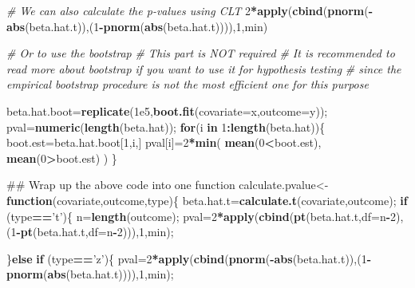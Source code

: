 \documentclass[12pt,]{book}
\newenvironment{Shaded}{\begin{snugshade}}{\end{snugshade}}
\newcommand{\KeywordTok}[1]{\textcolor[rgb]{0.13,0.29,0.53}{\textbf{#1}}}
\newcommand{\DataTypeTok}[1]{\textcolor[rgb]{0.13,0.29,0.53}{#1}}
\newcommand{\DecValTok}[1]{\textcolor[rgb]{0.00,0.00,0.81}{#1}}
\newcommand{\FloatTok}[1]{\textcolor[rgb]{0.00,0.00,0.81}{#1}}
\newcommand{\StringTok}[1]{\textcolor[rgb]{0.31,0.60,0.02}{#1}}
\newcommand{\CommentTok}[1]{\textcolor[rgb]{0.56,0.35,0.01}{\textit{#1}}}
\newcommand{\ControlFlowTok}[1]{\textcolor[rgb]{0.13,0.29,0.53}{\textbf{#1}}}
\newcommand{\OperatorTok}[1]{\textcolor[rgb]{0.81,0.36,0.00}{\textbf{#1}}}
\newcommand{\NormalTok}[1]{#1}
\begin{document}
\begin{Shaded}
\begin{Highlighting}[]
\CommentTok{# We can also calculate the p-values using CLT}
\DecValTok{2}\OperatorTok{*}\KeywordTok{apply}\NormalTok{(}\KeywordTok{cbind}\NormalTok{(}\KeywordTok{pnorm}\NormalTok{(}\OperatorTok{-}\KeywordTok{abs}\NormalTok{(beta.hat.t)),(}\DecValTok{1}\OperatorTok{-}\KeywordTok{pnorm}\NormalTok{(}\KeywordTok{abs}\NormalTok{(beta.hat.t)))),}\DecValTok{1}\NormalTok{,min)}

\CommentTok{# Or to use the bootstrap }
\CommentTok{# This part is NOT required}
\CommentTok{# It is recommended to read more about bootstrap if you want to use it for hypothesis testing}
\CommentTok{# since the empirical bootstrap procedure is not the most efficient one for this purpose }

\NormalTok{beta.hat.boot=}\KeywordTok{replicate}\NormalTok{(}\FloatTok{1e5}\NormalTok{,}\KeywordTok{boot.fit}\NormalTok{(}\DataTypeTok{covariate=}\NormalTok{x,}\DataTypeTok{outcome=}\NormalTok{y));}
\NormalTok{pval=}\KeywordTok{numeric}\NormalTok{(}\KeywordTok{length}\NormalTok{(beta.hat));}
\ControlFlowTok{for}\NormalTok{(i }\ControlFlowTok{in} \DecValTok{1}\OperatorTok{:}\KeywordTok{length}\NormalTok{(beta.hat))\{}
\NormalTok{  boot.est=beta.hat.boot[}\DecValTok{1}\NormalTok{,i,]}
\NormalTok{  pval[i]=}\DecValTok{2}\OperatorTok{*}\KeywordTok{min}\NormalTok{( }\KeywordTok{mean}\NormalTok{(}\DecValTok{0}\OperatorTok{<}\NormalTok{boot.est), }\KeywordTok{mean}\NormalTok{(}\DecValTok{0}\OperatorTok{>}\NormalTok{boot.est) )}
\NormalTok{\}}

\NormalTok{## Wrap up the above code into one function}
\NormalTok{calculate.pvalue<-}\ControlFlowTok{function}\NormalTok{(covariate,outcome,type)\{}
\NormalTok{  beta.hat.t=}\KeywordTok{calculate.t}\NormalTok{(covariate,outcome);}
  \ControlFlowTok{if}\NormalTok{ (type}\OperatorTok{==}\StringTok{'t'}\NormalTok{)\{}
\NormalTok{    n=}\KeywordTok{length}\NormalTok{(outcome);}
\NormalTok{    pval=}\DecValTok{2}\OperatorTok{*}\KeywordTok{apply}\NormalTok{(}\KeywordTok{cbind}\NormalTok{(}\KeywordTok{pt}\NormalTok{(beta.hat.t,}\DataTypeTok{df=}\NormalTok{n}\OperatorTok{-}\DecValTok{2}\NormalTok{),(}\DecValTok{1}\OperatorTok{-}\KeywordTok{pt}\NormalTok{(beta.hat.t,}\DataTypeTok{df=}\NormalTok{n}\OperatorTok{-}\DecValTok{2}\NormalTok{))),}\DecValTok{1}\NormalTok{,min);}

\NormalTok{  \}}\ControlFlowTok{else} \ControlFlowTok{if}\NormalTok{ (type}\OperatorTok{==}\StringTok{'z'}\NormalTok{)\{}
\NormalTok{    pval=}\DecValTok{2}\OperatorTok{*}\KeywordTok{apply}\NormalTok{(}\KeywordTok{cbind}\NormalTok{(}\KeywordTok{pnorm}\NormalTok{(}\OperatorTok{-}\KeywordTok{abs}\NormalTok{(beta.hat.t)),(}\DecValTok{1}\OperatorTok{-}\KeywordTok{pnorm}\NormalTok{(}\KeywordTok{abs}\NormalTok{(beta.hat.t)))),}\DecValTok{1}\NormalTok{,min);}
    

\end{Highlighting}
\end{Shaded}
\end{document}
